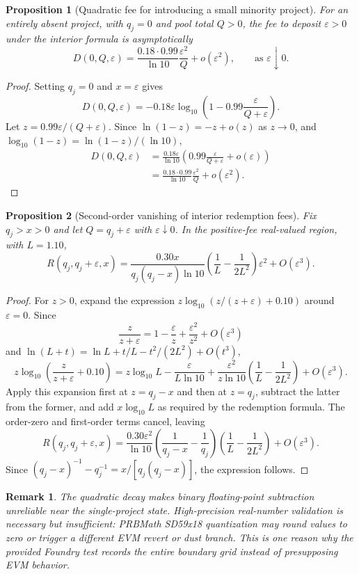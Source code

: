 \documentclass[11pt]{article}
\newtheorem{proposition}{Proposition}
\newtheorem{remark}{Remark}
\begin{document}
\begin{proposition}[Quadratic fee for introducing a small minority project]
For an entirely absent project, with $q_j=0$ and pool total $Q>0$, the fee to deposit $\varepsilon>0$ under the interior formula is asymptotically
\[
D(0,Q,\varepsilon)
=\frac{0.18\cdot0.99}{\ln10}\frac{\varepsilon^2}{Q}+o(\varepsilon^2),
\qquad\text{as }\varepsilon\downarrow0.
\]
\end{proposition}
\begin{proof}
Setting $q_j=0$ and $x=\varepsilon$ gives
\[
D(0,Q,\varepsilon)=-0.18\varepsilon\log_{10}\left(1-0.99\frac{\varepsilon}{Q+\varepsilon}\right).
\]
Let $z=0.99\varepsilon/(Q+\varepsilon)$. Since $\ln(1-z)=-z+o(z)$ as $z\to0$, and $\log_{10}(1-z)=\ln(1-z)/(\ln10)$,
\begin{align*}
D(0,Q,\varepsilon)
&=\frac{0.18\varepsilon}{\ln10}\left(0.99\frac{\varepsilon}{Q+\varepsilon}+o(\varepsilon)\right)\\
&=\frac{0.18\cdot0.99}{\ln10}\frac{\varepsilon^2}{Q}+o(\varepsilon^2).
\end{align*}
\end{proof}


\begin{proposition}[Second-order vanishing of interior redemption fees]
Fix $q_j>x>0$ and let $Q=q_j+\varepsilon$ with $\varepsilon\downarrow0$. In the positive-fee real-valued region, with $L=1.10$,
\[
R(q_j,q_j+\varepsilon,x)=\frac{0.30x}{q_j(q_j-x)\ln10}
\left(\frac{1}{L}-\frac{1}{2L^2}\right)\varepsilon^2+O(\varepsilon^3).
\]
\end{proposition}
\begin{proof}
For $z>0$, expand the expression $z\log_{10}(z/(z+\varepsilon)+0.10)$ around $\varepsilon=0$. Since
\[
\frac{z}{z+\varepsilon}=1-\frac{\varepsilon}{z}+\frac{\varepsilon^2}{z^2}+O(\varepsilon^3)
\]
and $\ln(L+t)=\ln L+t/L-t^2/(2L^2)+O(t^3)$,
\[
z\log_{10}\left(\frac{z}{z+\varepsilon}+0.10\right)
=z\log_{10}L-\frac{\varepsilon}{L\ln10}
+\frac{\varepsilon^2}{z\ln10}\left(\frac{1}{L}-\frac{1}{2L^2}\right)+O(\varepsilon^3).
\]
Apply this expansion first at $z=q_j-x$ and then at $z=q_j$, subtract the latter from the former, and add $x\log_{10}L$ as required by the redemption formula. The order-zero and first-order terms cancel, leaving
\[
R(q_j,q_j+\varepsilon,x)=\frac{0.30\varepsilon^2}{\ln10}
\left(\frac{1}{q_j-x}-\frac{1}{q_j}\right)
\left(\frac{1}{L}-\frac{1}{2L^2}\right)+O(\varepsilon^3).
\]
Since $(q_j-x)^{-1}-q_j^{-1}=x/[q_j(q_j-x)]$, the expression follows.
\end{proof}
\begin{remark}
The quadratic decay makes binary floating-point subtraction unreliable near the single-project state. High-precision real-number validation is necessary but insufficient: PRBMath SD59x18 quantization may round values to zero or trigger a different EVM revert or dust branch. This is one reason why the provided Foundry test records the entire boundary grid instead of presupposing EVM behavior.
\end{remark}
\end{document}
